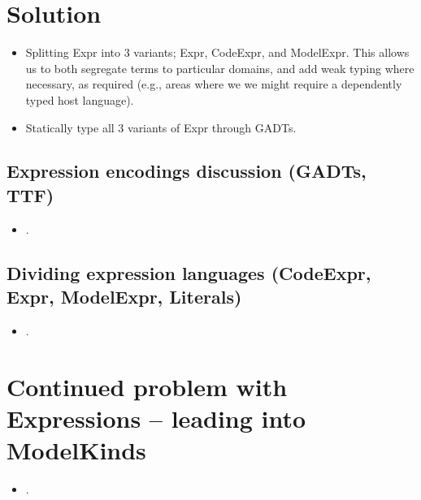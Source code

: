\section{Solution}

\begin{itemize}
    
    \item Splitting Expr into 3 variants; Expr, CodeExpr, and ModelExpr.
          This allows us to both segregate terms to particular domains, and
          add weak typing where necessary, as required (e.g., areas where we
          we might require a dependently typed host language).

    \item Statically type all 3 variants of Expr through GADTs.

\end{itemize}

\subsection{Expression encodings discussion (GADTs, TTF)}

\begin{itemize}
    
    \item .

\end{itemize}

\subsection{Dividing expression languages (CodeExpr, Expr, ModelExpr, Literals)}

\begin{itemize}
    
    \item .

\end{itemize}

\section{Continued problem with Expressions -- leading into ModelKinds}

\begin{itemize}
    
    \item .

\end{itemize}
